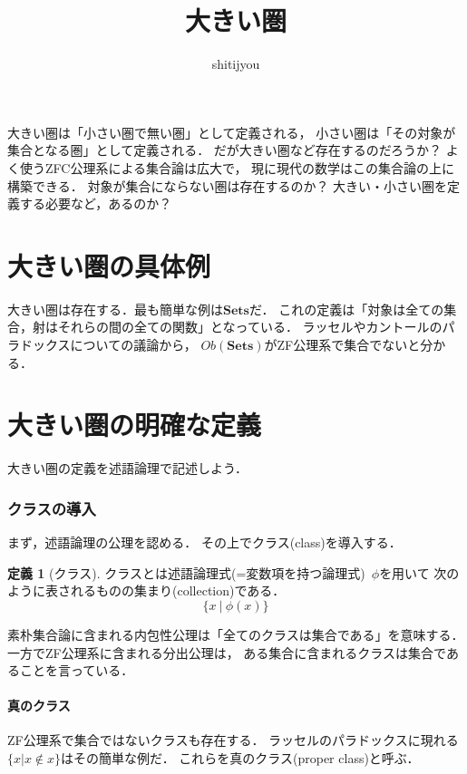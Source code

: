 \documentclass[a4j]{jarticle}
\title{大きい圏}
\author{shitijyou}
\theoremstyle{definition}
\newtheorem{definition}[theorem]{定義}
\begin{document}
    \maketitle

    大きい圏は「小さい圏で無い圏」として定義される，
    小さい圏は「その対象が集合となる圏」として定義される．
    だが大きい圏など存在するのだろうか？
    よく使うZFC公理系による集合論は広大で，
    現に現代の数学はこの集合論の上に構築できる．
    対象が集合にならない圏は存在するのか？
    大きい・小さい圏を定義する必要など，あるのか？

    \section{大きい圏の具体例}
    大きい圏は存在する．最も簡単な例は$\mathbf{Sets}$だ．
    これの定義は「対象は全ての集合，射はそれらの間の全ての関数」となっている．
    ラッセルやカントールのパラドックスについての議論から，
    $Ob(\mathbf{Sets})$がZF公理系で集合でないと分かる．

    \section{大きい圏の明確な定義}
        大きい圏の定義を述語論理で記述しよう．

        \subsubsection{クラスの導入}
            まず，述語論理の公理を認める．
            その上でクラス(class)を導入する．

            \begin{definition}[クラス]
                クラスとは述語論理式(=変数項を持つ論理式)~$\phi$を用いて
                次のように表されるものの集まり(collection)である．
                \[ \{x ~ | ~ \phi(x)\} \]
            \end{definition}

            素朴集合論に含まれる内包性公理は「全てのクラスは集合である」を意味する．
            一方でZF公理系に含まれる分出公理は，
            ある集合に含まれるクラスは集合であることを言っている．

        \paragraph{ 真のクラス }
            ZF公理系で集合ではないクラスも存在する．
            ラッセルのパラドックスに現れる$\{x | x \notin x\}$はその簡単な例だ．
            これらを真のクラス(proper class)と呼ぶ．
\end{document}
